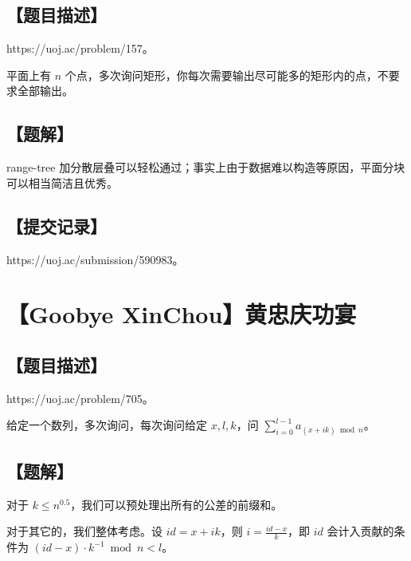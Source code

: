\documentclass[UTF8,12pt,a4paper]{ctexart}
\begin{document}
	\subsection*{【题目描述】}
	
	https://uoj.ac/problem/157。
	
	平面上有 $n$ 个点，多次询问矩形，你每次需要输出尽可能多的矩形内的点，不要求全部输出。
	
	\subsection*{【题解】}
	
	range-tree 加分散层叠可以轻松通过；事实上由于数据难以构造等原因，平面分块可以相当简洁且优秀。
	
	\subsection*{【提交记录】}
	
	https://uoj.ac/submission/590983。
	
	
	\section*{【Goobye XinChou】黄忠庆功宴}
	
	\subsection*{【题目描述】}
	
	https://uoj.ac/problem/705。
	
	给定一个数列，多次询问，每次询问给定 $x,l,k$，问 $\sum_{i=0}^{l-1}a_{(x+ik)\bmod n}$。
	
	\subsection*{【题解】}
	
	对于 $k\le n^{0.5}$，我们可以预处理出所有的公差的前缀和。
	
	对于其它的，我们整体考虑。设 $id=x+ik$，则 $i=\frac{id-x}k$，即 $id$ 会计入贡献的条件为 $(id-x)\cdot k^{-1}\bmod n < l$。
	
\end{document}
